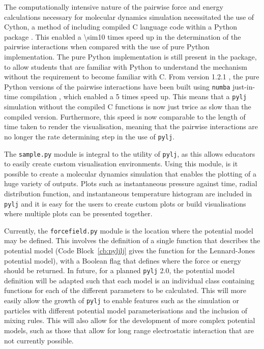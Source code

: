 The computationally intensive nature of the pairwise force and energy calculations necessary for molecular dynamics simulation necessitated the use of Cython, a method of including compiled C language code within a Python package \cite{noauthor_cython_nodate}.
This enabled a \num{\sim10} times speed up in the determination of the pairwise interactions when compared with the use of pure Python implementation.
The pure Python implementation is still present in the package, to allow students that are familiar with Python to understand the mechanism without the requirement to become familiar with C.
From version 1.2.1 \cite{mccluskey_arm61/pylj_2019-1}, the pure Python versions of the pairwise interactions have been built using \texttt{numba} just-in-time compilation \cite{noauthor_numba_nodate}, which enabled a \num{5} times speed up.
This means that a \texttt{pylj} simulation without the compiled C functions is now just twice as slow than the compiled version.
Furthermore, this speed is now comparable to the length of time taken to render the visualisation, meaning that the pairwise interactions are no longer the rate determining step in the use of \texttt{pylj}.

The \texttt{sample.py} module is integral to the utility of \texttt{pylj}, as this allows educators to easily create custom visualisation environments.
Using this module, is it possible to create a molecular dynamics simulation that enables the plotting of a huge variety of outputs.
Plots such as instantaneous pressure against time, radial distribution function, and instantaneous temperature histogram are included in \texttt{pylj} and it is easy for the users to create custom plots or build visualisations where multiple plots can be presented together.

Currently, the \texttt{forcefield.py} module is the location where the potential model may be defined.
This involves the definition of a single function that describes the potential model (Code Block~\ref{cb:pyljlj} gives the function for the Lennard-Jones potential model), with a Boolean flag that defines where the force or energy should be returned.
In future, for a planned \texttt{pylj} \num{2.0}, the potential model definition will be adapted such that each model is an individual class containing functions for each of the different parameters to be calculated.
This will more easily allow the growth of \texttt{pylj} to enable features such as the simulation or particles with different potential model parameterisations and the inclusion of mixing rules.
This will also allow for the development of more complex potential models, such as those that allow for long range electrostatic interaction that are not currently possible.
%
\begin{figure}
    \centering
        
\end{figure}
%

